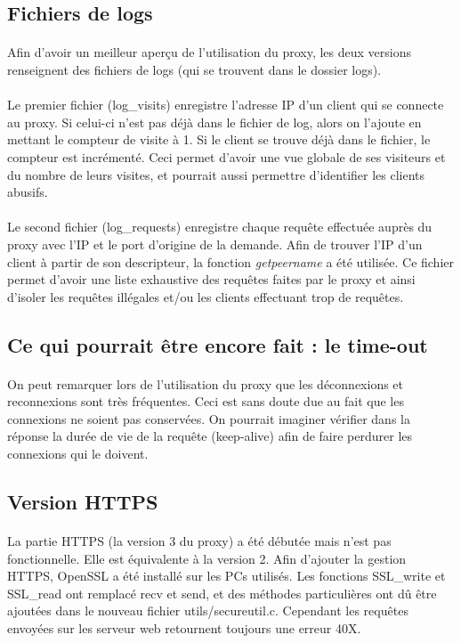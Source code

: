 \subsection{Fichiers de logs}
\paragraph{}
Afin d'avoir un meilleur aperçu de l'utilisation du proxy, les deux versions renseignent des fichiers de logs (qui se trouvent dans le dossier logs). 
\paragraph{}
Le premier fichier (log\_visits) enregistre l'adresse IP d'un client qui se connecte au proxy. Si celui-ci n'est pas déjà dans le fichier de log, alors on l'ajoute en mettant le compteur de visite à 1. Si le client se trouve déjà dans le fichier, le compteur est incrémenté. Ceci permet d'avoir une vue globale de ses visiteurs et du nombre de leurs visites, et pourrait aussi permettre d'identifier les clients abusifs. 
\paragraph{}
Le second fichier (log\_requests) enregistre chaque requête effectuée auprès du proxy avec l'IP et le port d'origine de la demande. Afin de trouver l'IP d'un client à partir de son descripteur, la fonction \textit{getpeername} a été utilisée. Ce fichier permet d'avoir une liste exhaustive des requêtes faites par le proxy et ainsi d'isoler les requêtes illégales et/ou les clients effectuant trop de requêtes.

\subsection{Ce qui pourrait être encore fait : le time-out}
\paragraph{}
On peut remarquer lors de l'utilisation du proxy que les déconnexions et reconnexions sont très fréquentes. Ceci est sans doute due au fait que les connexions ne soient pas conservées. On pourrait imaginer vérifier dans la réponse la durée de vie de la requête (keep-alive) afin de faire perdurer les connexions qui le doivent. 

\subsection{Version HTTPS}
\paragraph{}
La partie HTTPS (la version 3 du proxy) a été débutée mais n'est pas fonctionnelle. Elle est équivalente à la version 2.
Afin d'ajouter la gestion HTTPS, OpenSSL a été installé sur les PCs utilisés. Les fonctions SSL\_write et SSL\_read ont remplacé recv et send, et des méthodes particulières ont dû être ajoutées dans le nouveau fichier utils/secureutil.c. 
Cependant les requêtes envoyées sur les serveur web retournent toujours une erreur 40X. 